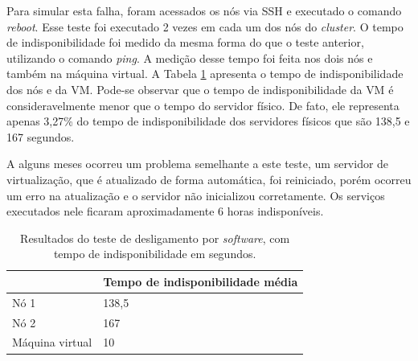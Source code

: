 Para simular esta falha, foram acessados os nós via \ac{SSH} e executado o comando \textit{reboot}.
Esse teste foi executado 2 vezes em cada um dos nós do \textit{cluster}. O tempo de indisponibilidade foi medido da mesma forma do que o teste 
anterior, utilizando o comando \textit{ping}. A medição desse tempo foi feita nos dois nós e também na máquina virtual. 
A Tabela \ref{tab:teste2resultados} apresenta o tempo de indisponibilidade dos nós e da \ac{VM}. 
Pode-se observar que o tempo de indisponibilidade da \ac{VM} é consideravelmente menor que o tempo do servidor físico. De fato, ele representa 
apenas 3,27\% do tempo de indisponibilidade dos servidores físicos que são 138,5 e 167 segundos. 

A alguns meses ocorreu um problema semelhante a este teste, um servidor de virtualização, que é atualizado de forma automática, foi reiniciado, 
porém ocorreu um erro na atualização e o servidor não inicializou corretamente. Os serviços executados nele ficaram aproximadamente 
6 horas indisponíveis.


\begin{table}[h!]
\caption{Resultados do teste de desligamento por \textit{software}, com tempo de indisponibilidade em segundos.}
\small
\label{tab:teste2resultados}
\begin{center}
\begin{tabular}{|l|l|}\hline
 & \textbf{Tempo de indisponibilidade média} \\\hline %
Nó 1 & 138,5 \\\hline %
Nó 2 & 167 \\\hline %
Máquina virtual & 10 \\\hline %
\end{tabular}
\end{center}
\end{table}


